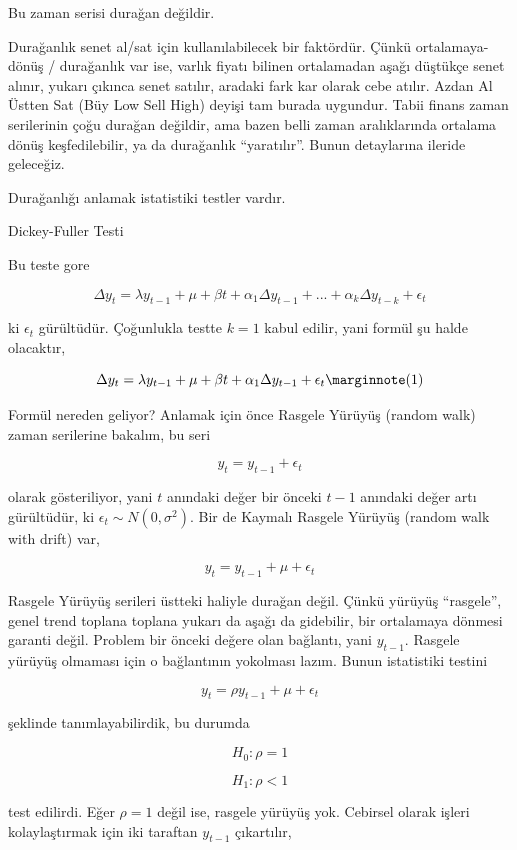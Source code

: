 \documentclass[12pt,fleqn]{article}\usepackage{../../common}
\begin{document}
Bu zaman serisi durağan değildir. 

Durağanlık senet al/sat için kullanılabilecek bir faktördür. Çünkü
ortalamaya-dönüş / durağanlık var ise, varlık fiyatı bilinen ortalamadan
aşağı düştükçe senet alınır, yukarı çıkınca senet satılır, aradaki fark kar
olarak cebe atılır. Azdan Al Üstten Sat (Büy Low Sell High) deyişi tam
burada uygundur. Tabii finans zaman serilerinin çoğu durağan değildir, ama
bazen belli zaman aralıklarında ortalama dönüş keşfedilebilir, ya da
durağanlık ``yaratılır''. Bunun detaylarına ileride geleceğiz. 

Durağanlığı anlamak istatistiki testler vardır.

Dickey-Fuller Testi

Bu teste gore 

$$ \Delta y_t = \lambda y_{t-1} + \mu + \beta t + 
\alpha_1 \Delta y_{t-1} + ... + 
\alpha_k \Delta y_{t-k} + \epsilon_t
$$

ki $\epsilon_t$ gürültüdür. Çoğunlukla testte $k=1$ kabul edilir, yani
formül şu halde olacaktır,

$$ \Delta y_t = \lambda y_{t-1} + 
\mu + \beta t +  
\alpha_1 \Delta y_{t-1} + 
\epsilon_t 
\mlabel{1}
$$

Formül nereden geliyor? Anlamak için önce Rasgele Yürüyüş (random walk) zaman
serilerine bakalım, bu seri

$$ y_t = y_{t-1} + \epsilon_t $$

olarak gösteriliyor, yani $t$ anındaki değer bir önceki $t-1$ anındaki değer
artı gürültüdür, ki $\epsilon_t \sim N(0,\sigma^2)$. Bir de Kaymalı Rasgele
Yürüyüş (random walk with drift) var,

$$ y_t = y_{t-1} + \mu + \epsilon_t $$

Rasgele Yürüyüş serileri üstteki haliyle durağan değil. Çünkü yürüyüş
``rasgele'', genel trend toplana toplana yukarı da aşağı da gidebilir, bir
ortalamaya dönmesi garanti değil. Problem bir önceki değere olan bağlantı,
yani $y_{t-1}$. Rasgele yürüyüş olmaması için o bağlantının yokolması
lazım. Bunun istatistiki testini

$$ y_t = \rho y_{t-1} + \mu + \epsilon_t $$

şeklinde tanımlayabilirdik, bu durumda

$$ H_0: \rho = 1 $$

$$ H_1: \rho < 1 $$

test edilirdi. Eğer $\rho=1$ değil ise, rasgele yürüyüş yok. Cebirsel olarak
işleri kolaylaştırmak için iki taraftan $y_{t-1}$ çıkartılır,
\end{document}
